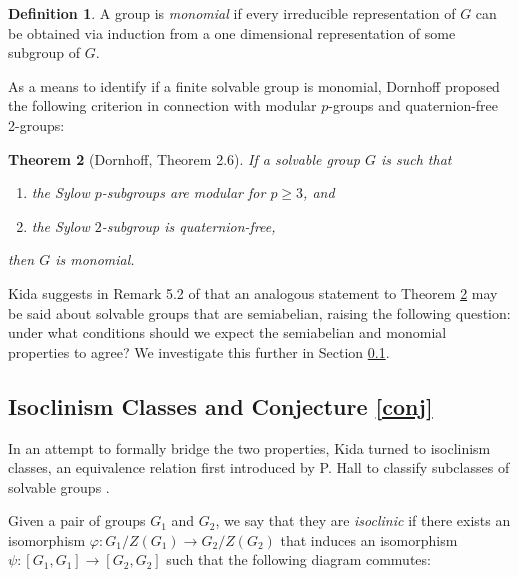 \documentclass[11pt]{article}
\newtheorem{thm}{Theorem}[section]
\theoremstyle{definition}
\newtheorem{defn}[thm]{Definition}
\numberwithin{equation}{section}
\begin{document}
\begin{humanblock}
\begin{defn}
    A group is \textit{monomial} if every irreducible representation of $G$
 can be obtained via induction from a one dimensional representation of some subgroup of $G$.
\end{defn}

As a means to identify if a finite solvable group is monomial, Dornhoff \cite{dornhoff1967mgroups} proposed the following criterion in connection with modular $p$-groups and quaternion-free 2-groups:

\begin{thm}[Dornhoff, Theorem 2.6]\label{Dornhoff}
    If a solvable group $G$ is such that 

    \begin{enumerate}
        \item the Sylow $p$-subgroups are modular for $p \geq 3$, and
        \item the Sylow $2$-subgroup is quaternion-free,
    \end{enumerate}
    then $G$ is monomial. 
\end{thm}


Kida suggests in Remark 5.2 of \cite{Kida25} that an analogous statement to Theorem \ref{Dornhoff} may be said about solvable groups that are semiabelian, raising the following question: under what conditions should we expect the semiabelian and monomial properties to agree? We investigate this further in Section \ref{subsec: isoclinism}. 

\subsection{Isoclinism Classes and Conjecture \ref{conj}}\label{subsec: isoclinism} 
In an attempt to formally bridge the two properties, Kida turned to isoclinism classes, an equivalence relation first introduced by P. Hall to classify subclasses of solvable groups {\cite{Hall40}}. 


Given a pair of groups $G_1$ and $G_2$, we say that they are \textit{isoclinic} if there exists an isomorphism $\varphi: G_1/Z(G_1) \to G_2/Z(G_2)$ that induces an isomorphism $\psi: [G_1, G_1] \to [G_2,G_2]$ such that the following diagram commutes: 


\begin{center}
\end{center}



\end{humanblock}
\end{document}
